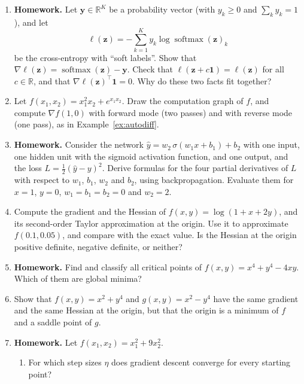\documentclass[11pt]{article}
\newcommand{\homework}{\textcolor{red!70!black}{\textbf{Homework.}}}
\newcommand{\norm}[1]{\lVert #1 \rVert}
\theoremstyle{definition}
\theoremstyle{plain}
\theoremstyle{remark}
\DeclareMathOperator{\tr}{tr}
\DeclareMathOperator{\softmax}{softmax}
\begin{document}
\begin{enumerate}[leftmargin=*]
\begin{enumerate}[label=(\alph*)]
        \item Let $X$ be invertible. Show that $(X + H)^{-1} = X^{-1} - X^{-1}HX^{-1} + o(\norm{H}_F)$, by multiplying the right side by $X + H$. Conclude that $\nabla_X\tr(AX^{-1}) = -X^{-\top}A^\top X^{-\top}$.
    \end{enumerate}
    \item \homework{} Let $\mathbf{y} \in \mathbb{R}^K$ be a probability vector (with $y_k \geq 0$ and $\sum_k y_k = 1$), and let
    \[\ell(\mathbf{z}) = -\sum_{k=1}^K y_k\log\softmax(\mathbf{z})_k\]
    be the cross-entropy with ``soft labels''. Show that $\nabla\ell(\mathbf{z}) = \softmax(\mathbf{z}) - \mathbf{y}$. Check that $\ell(\mathbf{z} + c\mathbf{1}) = \ell(\mathbf{z})$ for all $c \in \mathbb{R}$, and that $\nabla\ell(\mathbf{z})^\top\mathbf{1} = 0$. Why do these two facts fit together?
    \item Let $f(x_1, x_2) = x_1^2 x_2 + e^{x_1 x_2}$. Draw the computation graph of $f$, and compute $\nabla f(1, 0)$ with forward mode (two passes) and with reverse mode (one pass), as in Example~\ref{ex:autodiff}.
    \item \homework{} Consider the network $\hat y = w_2\,\sigma(w_1 x + b_1) + b_2$ with one input, one hidden unit with the sigmoid activation function, and one output, and the loss $L = \frac{1}{2}(\hat y - y)^2$. Derive formulas for the four partial derivatives of $L$ with respect to $w_1$, $b_1$, $w_2$ and $b_2$, using backpropagation. Evaluate them for $x = 1$, $y = 0$, $w_1 = b_1 = b_2 = 0$ and $w_2 = 2$.
    \item Compute the gradient and the Hessian of $f(x, y) = \log(1 + x + 2y)$, and its second-order Taylor approximation at the origin. Use it to approximate $f(0.1, 0.05)$, and compare with the exact value. Is the Hessian at the origin positive definite, negative definite, or neither?
    \item \homework{} Find and classify all critical points of $f(x, y) = x^4 + y^4 - 4xy$. Which of them are global minima?
    \item\label{ex3:inconclusive} Show that $f(x, y) = x^2 + y^4$ and $g(x, y) = x^2 - y^4$ have the same gradient and the same Hessian at the origin, but that the origin is a minimum of $f$ and a saddle point of $g$.
    \item \homework{} Let $f(x_1, x_2) = x_1^2 + 9x_2^2$.
    \begin{enumerate}[label=(\alph*)]
        \item For which step sizes $\eta$ does gradient descent converge for every starting point?

\end{enumerate}
\end{enumerate}
\end{document}
